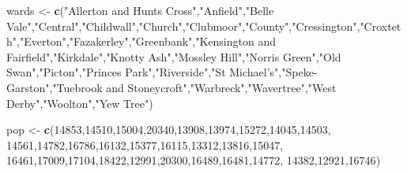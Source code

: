 \documentclass[]{book}
\newenvironment{Shaded}{\begin{snugshade}}{\end{snugshade}}
\newcommand{\KeywordTok}[1]{\textcolor[rgb]{0.13,0.29,0.53}{\textbf{#1}}}
\newcommand{\DecValTok}[1]{\textcolor[rgb]{0.00,0.00,0.81}{#1}}
\newcommand{\StringTok}[1]{\textcolor[rgb]{0.31,0.60,0.02}{#1}}
\newcommand{\NormalTok}[1]{#1}
\begin{document}
\begin{Shaded}
\begin{Highlighting}[]
\NormalTok{wards <-}\StringTok{ }\KeywordTok{c}\NormalTok{(}\StringTok{"Allerton and Hunts Cross"}\NormalTok{,}\StringTok{"Anfield"}\NormalTok{,}\StringTok{"Belle Vale"}\NormalTok{,}\StringTok{"Central"}\NormalTok{,}\StringTok{"Childwall"}\NormalTok{,}\StringTok{"Church"}\NormalTok{,}\StringTok{"Clubmoor"}\NormalTok{,}\StringTok{"County"}\NormalTok{,}\StringTok{"Cressington"}\NormalTok{,}\StringTok{"Croxteth"}\NormalTok{,}\StringTok{"Everton"}\NormalTok{,}\StringTok{"Fazakerley"}\NormalTok{,}\StringTok{"Greenbank"}\NormalTok{,}\StringTok{"Kensington and Fairfield"}\NormalTok{,}\StringTok{"Kirkdale"}\NormalTok{,}\StringTok{"Knotty Ash"}\NormalTok{,}\StringTok{"Mossley Hill"}\NormalTok{,}\StringTok{"Norris Green"}\NormalTok{,}\StringTok{"Old Swan"}\NormalTok{,}\StringTok{"Picton"}\NormalTok{,}\StringTok{"Princes Park"}\NormalTok{,}\StringTok{"Riverside"}\NormalTok{,}\StringTok{"St Michael's"}\NormalTok{,}\StringTok{"Speke-Garston"}\NormalTok{,}\StringTok{"Tuebrook and Stoneycroft"}\NormalTok{,}\StringTok{"Warbreck"}\NormalTok{,}\StringTok{"Wavertree"}\NormalTok{,}\StringTok{"West Derby"}\NormalTok{,}\StringTok{"Woolton"}\NormalTok{,}\StringTok{"Yew Tree"}\NormalTok{)}

\NormalTok{pop <-}\StringTok{ }\KeywordTok{c}\NormalTok{(}\DecValTok{14853}\NormalTok{,}\DecValTok{14510}\NormalTok{,}\DecValTok{15004}\NormalTok{,}\DecValTok{20340}\NormalTok{,}\DecValTok{13908}\NormalTok{,}\DecValTok{13974}\NormalTok{,}\DecValTok{15272}\NormalTok{,}\DecValTok{14045}\NormalTok{,}\DecValTok{14503}\NormalTok{,}
                \DecValTok{14561}\NormalTok{,}\DecValTok{14782}\NormalTok{,}\DecValTok{16786}\NormalTok{,}\DecValTok{16132}\NormalTok{,}\DecValTok{15377}\NormalTok{,}\DecValTok{16115}\NormalTok{,}\DecValTok{13312}\NormalTok{,}\DecValTok{13816}\NormalTok{,}\DecValTok{15047}\NormalTok{,}
                \DecValTok{16461}\NormalTok{,}\DecValTok{17009}\NormalTok{,}\DecValTok{17104}\NormalTok{,}\DecValTok{18422}\NormalTok{,}\DecValTok{12991}\NormalTok{,}\DecValTok{20300}\NormalTok{,}\DecValTok{16489}\NormalTok{,}\DecValTok{16481}\NormalTok{,}\DecValTok{14772}\NormalTok{,}
                \DecValTok{14382}\NormalTok{,}\DecValTok{12921}\NormalTok{,}\DecValTok{16746}\NormalTok{)}


\end{Highlighting}
\end{Shaded}
\end{document}
